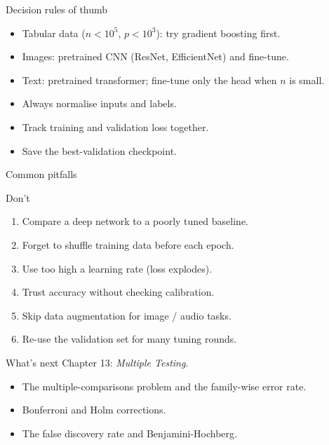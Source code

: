\documentclass[aspectratio=169,11pt]{beamer}
\begin{document}
\begin{frame}{Decision rules of thumb}
  \begin{itemize}
    \item Tabular data ($n < 10^5$, $p < 10^3$): try gradient
          boosting first.
    \item Images: pretrained CNN (ResNet, EfficientNet) and
          fine-tune.
    \item Text: pretrained transformer; fine-tune only the head when
          $n$ is small.
    \item Always normalise inputs and labels.
    \item Track training and validation loss together.
    \item Save the best-validation checkpoint.
  \end{itemize}
\end{frame}

\begin{frame}{Common pitfalls}
  \begin{alertblock}{Don't}
    \begin{enumerate}
      \item Compare a deep network to a poorly tuned baseline.
      \item Forget to shuffle training data before each epoch.
      \item Use too high a learning rate (loss explodes).
      \item Trust accuracy without checking calibration.
      \item Skip data augmentation for image / audio tasks.
      \item Re-use the validation set for many tuning rounds.
    \end{enumerate}
  \end{alertblock}
\end{frame}

\begin{frame}{What's next}
  Chapter 13: \emph{Multiple Testing}.
  \begin{itemize}
    \item The multiple-comparisons problem and the family-wise error rate.
    \item Bonferroni and Holm corrections.
    \item The false discovery rate and Benjamini-Hochberg.
  \end{itemize}
\end{frame}


\appendix
\AtBeginSection[]{}
\end{document}
